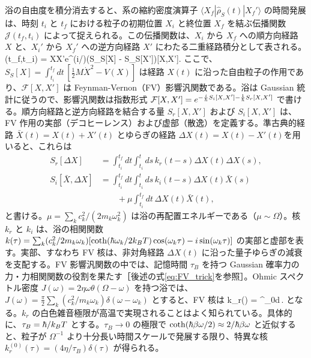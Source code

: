 浴の自由度を積分消去すると、系の縮約密度演算子 $\langle X_f|\hat\rho_S(t)|X_f'\rangle$ の時間発展は、時刻 $t_i$ と $t_f$ における粒子の初期位置 $X_i$ と終位置 $X_f$ を結ぶ伝播関数 $\mathcal J(t_f,t_i)$ によって捉えられる。この伝播関数は、$X_i$ から $X_f$ への順方向経路 $X$ と、$X_i'$ から $X_f'$ への逆方向経路 $X'$ にわたる二重経路積分として表される\cite{Weiss2011}。
\be\label{eq:FV-Weiss}
(t_f,t_i) = \int{}XX'e^{(i/\hb)(S_S[X] - S_S[X'])}[X,X'].
\ee
ここで、$S_S[X]=\int_{t_i}^{t_f}dt\,[\frac12M\dot X^2-V(X)]$ は経路 $X(t)$ に沿った自由粒子の作用であり、$\mathcal F[X,X']$ は Feynman-Vernon（FV）影響汎関数である。浴は Gaussian 統計に従うので、影響汎関数は指数形式 $\mathcal F[X,X']=e^{-\frac{i}{\hbar}S_i[X,X']-\frac1{\hbar}S_r[X,X']}$ で書ける。順方向経路と逆方向経路を結合する量 $S_r[X,X']$ および $S_i[X,X']$ は、FV 作用の実部（デコヒーレンス）および虚部（散逸）を定義する。準古典的経路 $\bar X(t)=X(t)+X'(t)$ とゆらぎの経路 $\Delta X(t)=X(t)-X'(t)$\cite{Weiss2011}を用いると、これらは
\begin{align}
S_r[\Delta X] &= \int^{t_f}_{t_i}dt\int^{t}_{t_i}ds\,k_r(t-s)\Delta X(t)\Delta X(s),\label{eq:noise_action} \\
S_i[\bar{X},\Delta X] &= \int^{t_f}_{t_i}dt\int^{t}_{t_i}ds\,k_i(t-s)\Delta{X}(t)\bar{X}(s)\nonumber\\
&\qquad + \mu\int^{t_f}_{t_i}dt\,\Delta X(t)\bar{X}(t),
\end{align}
と書ける。$\mu=\sum_kc_k^2/(2m_k\omega_k^2)$ は浴の再配置エネルギーである（$\mu\sim\Omega$）。核 $k_r$ と $k_i$ は、浴の相関関数 $k(\tau)=\sum_k(c_k^2/2m_k\omega_k)[\coth(\hbar\omega_k/2k_BT)\cos(\omega_k\tau)-i\sin(\omega_k\tau)]$ の実部と虚部を表す。実部、すなわち FV 核\cite{FeynmanVernon}は、非対角経路 $\Delta X(t)$ に沿った量子ゆらぎの減衰を支配する。FV 影響汎関数の中では、記憶時間 $\tau_B$ を持つ Gaussian 確率力の力・力相関関数の役割を果たす［後述の式\eqref{eq:FV_trick}を参照］。Ohmic スペクトル密度 $J(\omega)=2\eta\omega\theta(\Omega-\omega)$ を持つ浴では、$J(\omega)=\frac\pi2\sum_k(c_k^2/m_k\omega_k)\delta(\omega-\omega_k)$ とすると、FV 核は
\be\label{eq:FV}
k_r(\tau) = \frac{2\eta}{\pi}\int^{\Omega}_0d\omega\,\omega{}\cos{\omega\tau}.
\ee
となる。$k_r$ の白色雑音極限が高温で実現されることはよく知られている\cite{CaldeiraLeggettA}。具体的に、$\tau_B=\hbar/k_BT$ とする。$\tau_B\to0$ の極限で $\coth(\hbar\beta\omega/2)\approx2/\hbar\beta\omega$ と近似すると、粒子が $\Omega^{-1}$ より十分長い時間スケールで発展する限り、特異な核 $k_r^{(0)}(\tau)=(4\eta/\tau_B)\delta(\tau)$ が得られる。

